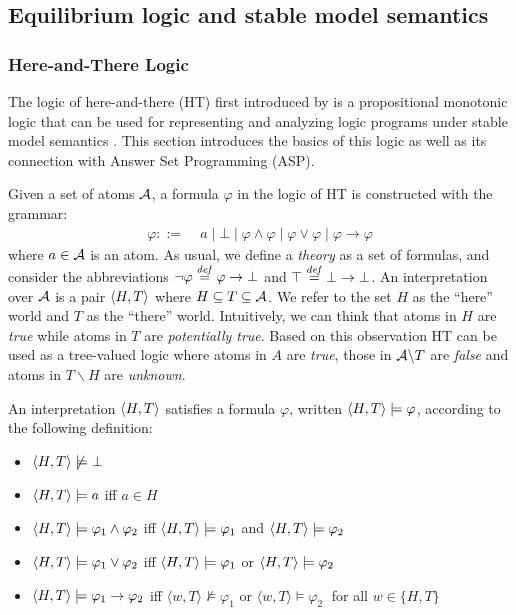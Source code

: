 \subsection{Equilibrium logic and stable model semantics  }

\subsubsection{Here-and-There Logic}

The logic of here-and-there (HT) first introduced by \cite{heyting30a} is a propositional monotonic logic that can be used for representing and analyzing logic programs under stable model semantics \cite{pearce96a,ferlif05a}. This section introduces the basics of this logic as well as its connection with Answer Set Programming (ASP).


Given a set of atoms $\mathcal{A }$, a formula $\varphi$ in the logic of HT is constructed with the grammar:
\begin{align*}
    \varphi ::= &\; a \mid \bot \mid
        \varphi \wedge \varphi \mid 
        \varphi \vee \varphi \mid
        \varphi \to \varphi 
\end{align*}
where $a\in \mathcal{A }$ is an atom. As usual, we define a \emph{theory} as a set of formulas, and consider the abbreviations $\neg \varphi \overset{\mathit{def}}{=} \varphi \to \bot$ and $\top \overset{\mathit{def}}{=} \bot \to \bot$. An interpretation over $\mathcal{A }$ is a pair $\langle H,T \rangle$ where $H\subseteq T \subseteq \mathcal{A }$. We refer to the set $H$ as the ``here'' world and $T$ as the ``there'' world. Intuitively, we can think that atoms in $H$ are \emph{true} while atoms in $T$ are \emph{potentially true}. Based on this observation HT can be used as a tree-valued logic where atoms in $A$ are \emph{true}, those in $\mathcal{A } \backslash T$ are \emph{false} and atoms in $T \backslash H$ are \emph{unknown}. 

\begin{definition}[Semantics]
    An interpretation $\langle H,T \rangle$ satisfies a formula $\varphi$, written $\langle H,T \rangle \models \varphi$, according to the following definition:
    \begin{itemize}
        \item $\langle H,T \rangle \not \models \bot$
        \item $\langle H,T \rangle \models a$ iff $a\in H$
        \item $\langle H,T \rangle \models \varphi_1 \wedge \varphi_2$ iff $\langle H,T \rangle \models \varphi_1$ and  $\langle H,T \rangle \models \varphi_2$
        \item $\langle H,T \rangle \models \varphi_1 \vee \varphi_2$ iff $\langle H,T \rangle \models \varphi_1$ or  $\langle H,T \rangle \models \varphi_2$
        \item $\langle H,T \rangle \models \varphi_1 \to \varphi_2$ iff $\langle w,T \rangle \not \models \varphi_1$ or  $\langle w,T \rangle \models \varphi_2\;$ for all 
        $w \in \{H,T\}$
    \end{itemize}
\end{definition}

